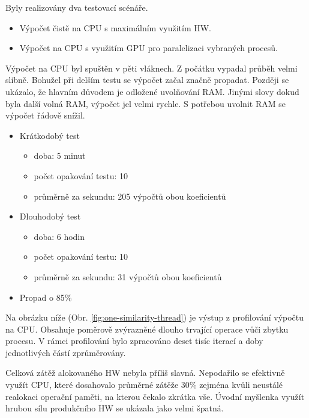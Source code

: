 Byly realizovány dva testovací scénáře.
\begin{itemize}
	\setlength{\parskip}{0pt}
	\setlength{\itemsep}{0pt}
	\item {Výpočet čistě na CPU s maximálním využitím HW.}
	\item {Výpočet na CPU s využitím GPU pro paralelizaci vybraných procesů.}
\end{itemize}

Výpočet na CPU byl spuštěn v pěti vláknech. Z počátku vypadal průběh velmi slibně. Bohužel při delším testu se výpočet začal značně propadat. Později se ukázalo, že hlavním důvodem je odložené uvolňování RAM. Jinými slovy dokud byla další volná RAM, výpočet jel velmi rychle. S potřebou uvolnit RAM se výpočet řádově snížil.
\begin{itemize}
	\setlength{\parskip}{0pt}
	\setlength{\itemsep}{0pt}
	\item {Krátkodobý test}
		\begin{itemize}
			\setlength{\parskip}{0pt}
			\setlength{\itemsep}{0pt}
			\item {doba: 5 minut}
			\item {počet opakování testu: 10}
			\item {průměrně za sekundu: 205 výpočtů obou koeficientů}
		\end{itemize}
	\item {Dlouhodobý test}
		\begin{itemize}
			\setlength{\parskip}{0pt}
			\setlength{\itemsep}{0pt}
			\item {doba: 6 hodin}
			\item {počet opakování testu: 10}
			\item {průměrně za sekundu: 31 výpočtů obou koeficientů}
		\end{itemize}
	\item {Propad o 85\%}
\end{itemize}

Na obrázku níže (Obr. \ref{fig:one-similarity-thread}) je výstup z profilování výpočtu na CPU. Obsahuje poměrově zvýrazněné dlouho trvající operace vůči zbytku procesu. V rámci profilování bylo zpracováno deset tisíc iterací a doby jednotlivých částí zprůměrovány.

Celková zátěž alokovaného HW nebyla příliš slavná. Nepodařilo se efektivně využít CPU, které dosahovalo průměrné zátěže 30\% zejména kvůli neustálé realokaci operační paměti, na kterou čekalo zkrátka vše.
Úvodní myšlenka využít hrubou sílu produkčního HW se ukázala jako velmi špatná.

